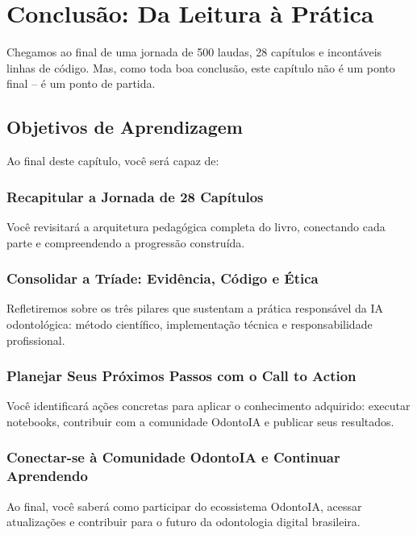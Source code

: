 \chapter{Conclusão: Da Leitura à Prática}
\label{cap:conclusao-final}

\nivelzero

Chegamos ao final de uma jornada de 500 laudas, 28 capítulos e incontáveis
linhas de código. Mas, como toda boa conclusão, este capítulo não é um ponto
final -- é um ponto de partida.

\section{Objetivos de Aprendizagem}

Ao final deste capítulo, você será capaz de:

\subsection{Recapitular a Jornada de 28 Capítulos}
Você revisitará a arquitetura pedagógica completa do livro, conectando cada parte e compreendendo a progressão construída.

\subsection{Consolidar a Tríade: Evidência, Código e Ética}
Refletiremos sobre os três pilares que sustentam a prática responsável da IA odontológica: método científico, implementação técnica e responsabilidade profissional.

\subsection{Planejar Seus Próximos Passos com o Call to Action}
Você identificará ações concretas para aplicar o conhecimento adquirido: executar notebooks, contribuir com a comunidade OdontoIA e publicar seus resultados.

\subsection{Conectar-se à Comunidade OdontoIA e Continuar Aprendendo}
Ao final, você saberá como participar do ecossistema OdontoIA, acessar atualizações e contribuir para o futuro da odontologia digital brasileira.

